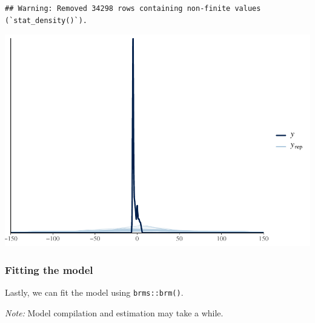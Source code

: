 \documentclass[
  11pt,
]{article}
\begin{document}
\begin{verbatim}
## Warning: Removed 34298 rows containing non-finite values (`stat_density()`).
\end{verbatim}

\begin{center}\includegraphics{02-02-lec_files/figure-latex/brms-priorpc-2-1} \end{center}

\hypertarget{fitting-the-model}{%
\subsubsection{Fitting the model}\label{fitting-the-model}}

Lastly, we can fit the model using \texttt{brms::brm()}.

\emph{Note:} Model compilation and estimation may take a while.
\end{document}
